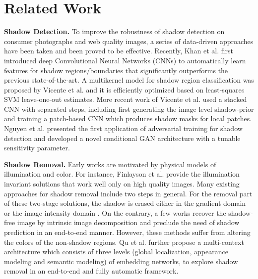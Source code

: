 \documentclass[10pt,twocolumn,letterpaper]{article}
\begin{document}
\section{Related Work}
\noindent \textbf{Shadow Detection.} To improve the robustness of shadow detection on consumer photographs and web quality images, a series of data-driven approaches \cite{huang2011characterizes,lalonde2010detecting,zhu2010learning} have been taken and been proved to be effective. Recently, Khan et al. \cite{khan2014automatic} first introduced deep Convolutional Neural Networks (CNNs) \cite{simonyan2014very} to automatically learn features for shadow regions/boundaries that significantly outperforms the previous state-of-the-art. A multikernel model for shadow region classification was proposed by Vicente et al. \cite{vicente2015leave} and it is efficiently optimized based on least-squares SVM leave-one-out estimates. More recent work of Vicente et al. \cite{vicente2016noisy} used a stacked CNN with separated steps, including first generating the image level shadow-prior and training a patch-based CNN which produces shadow masks for local patches. Nguyen et al. \cite{nguyen2017shadow} presented the first application of adversarial training for shadow detection and developed a novel conditional GAN architecture with a tunable sensitivity parameter.

\noindent \textbf{Shadow Removal.} Early works are motivated by physical models of illumination and color. For instance, Finlayson et al. \cite{finlayson2009entropy,finlayson2006removal} provide the illumination invariant solutions that work well only on high quality images. Many existing approaches for shadow removal include two steps in general. For the removal part of these two-stage solutions, the shadow is erased either in the gradient domain \cite{finlayson2002removing,mohan2007editing,barron2015shape} or the image intensity domain \cite{arbel2011shadow,guo2011single,guo2013paired,gong2014interactive,khan2016automatic}. On the contrary, a few works \cite{tappen2003recovering,yang2012shadow,qu2015pixel} recover the shadow-free image by intrinsic image decomposition and preclude the need of shadow prediction in an end-to-end manner. However, these methods suffer from altering the colors of the non-shadow regions.  Qu et al. \cite{qudeshadownet} further propose a multi-context architecture which consists of three levels (global localization, appearance modeling and semantic modeling) of embedding networks, to explore shadow removal in an end-to-end and fully automatic framework. 
\end{document}
